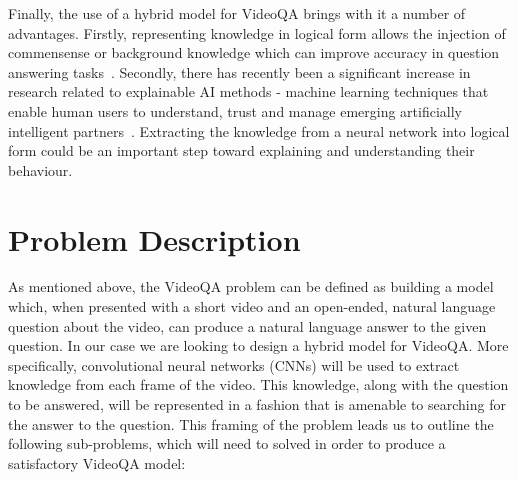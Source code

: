 \documentclass[../interim.tex]{subfiles}
\begin{document}
Finally, the use of a hybrid model for VideoQA brings with it a number of advantages. Firstly, representing knowledge in logical form allows the injection of commensense or background knowledge which can improve accuracy in question answering tasks~\cite{motivation:external-knowledge}. Secondly, there has recently been a significant increase in research related to explainable AI methods - machine learning techniques that enable human users to understand, trust and manage emerging artificially intelligent partners~\cite{def:xai}. Extracting the knowledge from a neural network into logical form could be an important step toward explaining and understanding their behaviour.


\section{Problem Description}

As mentioned above, the VideoQA problem can be defined as building a model which, when presented with a short video and an open-ended, natural language question about the video, can produce a natural language answer to the given question. In our case we are looking to design a hybrid model for VideoQA. More specifically, convolutional neural networks (CNNs) will be used to extract knowledge from each frame of the video. This knowledge, along with the question to be answered, will be represented in a fashion that is amenable to searching for the answer to the question. This framing of the problem leads us to outline the following sub-problems, which will need to solved in order to produce a satisfactory VideoQA model:
\end{document}
